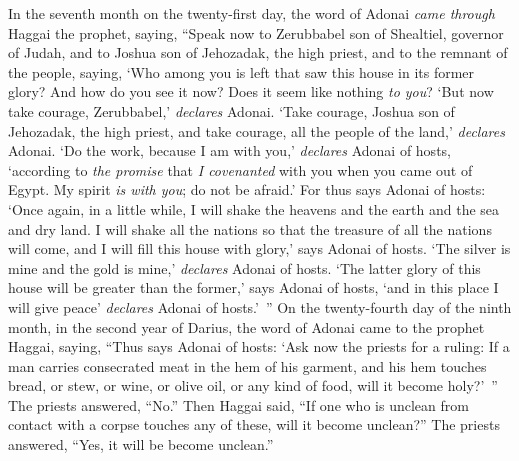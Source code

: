 \begin{biblechapter} %
 In the seventh month on the twenty-first day, the word of Adonai \textit{came through} Haggai the prophet, saying,
\verse “Speak now to Zerubbabel son of Shealtiel, governor of Judah, and to Joshua son of Jehozadak, the high priest, and to the remnant of the people, saying,
\verse ‘Who among you is left that saw this house in its former glory? And how do you see it now? Does it seem like nothing \textit{to you}?
\verse ‘But now take courage, Zerubbabel,’ \textit{declares} Adonai. ‘Take courage, Joshua son of Jehozadak, the high priest, and take courage, all the people of the land,’ \textit{declares} Adonai. ‘Do the work, because I am with you,’ \textit{declares} Adonai of hosts,
\verse ‘according to \textit{the promise} that \textit{I covenanted} with you when you came out of Egypt. My spirit \textit{is with you}; do not be afraid.’
\verse For thus says Adonai of hosts: ‘Once again, in a little while, I will shake the heavens and the earth and the sea and dry land.
\verse I will shake all the nations so that the treasure of all the nations will come, and I will fill this house with glory,’ says Adonai of hosts.
\verse ‘The silver is mine and the gold is mine,’ \textit{declares} Adonai of hosts.
\verse ‘The latter glory of this house will be greater than the former,’ says Adonai of hosts, ‘and in this place I will give peace’ \textit{declares} Adonai of hosts.’ ”
\verse On the twenty-fourth day of the ninth month, in the second year of Darius, the word of Adonai came to the prophet Haggai, saying,
\verse “Thus says Adonai of hosts: ‘Ask now the priests for a ruling:
\verse If a man carries consecrated meat in the hem of his garment, and his hem touches bread, or stew, or wine, or olive oil, or any kind of food, will it become holy?’ ” The priests answered, “No.”
\verse Then Haggai said, “If one who is unclean from contact with a corpse touches any of these, will it become unclean?” The priests answered, “Yes, it will be become unclean.”

\end{biblechapter}
